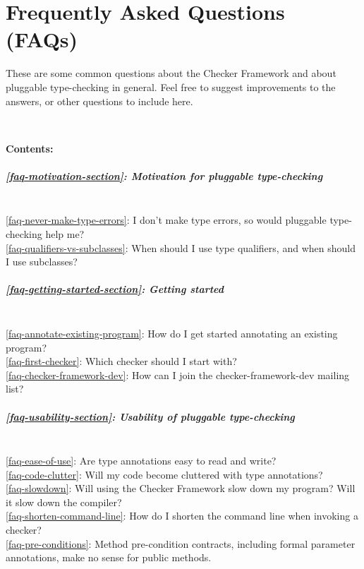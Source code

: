 \htmlhr
\chapter{Frequently Asked Questions (FAQs)\label{faq}}

These are some common questions about the Checker Framework and about
pluggable type-checking in general.  Feel free to suggest improvements to
the answers, or other questions to include here.


~

\newcommand{\faqtocpara}[1]{\paragraph{#1} ~}


\noindent
\textbf{Contents:}

\faqtocpara{\ref{faq-motivation-section}: Motivation for pluggable type-checking}
\\ \ref{faq-never-make-type-errors}: I don't make type errors, so would pluggable type-checking help me?
\\ \ref{faq-qualifiers-vs-subclasses}: When should I use type qualifiers, and when should I use subclasses?

\faqtocpara{\ref{faq-getting-started-section}: Getting started}
\\ \ref{faq-annotate-existing-program}: How do I get started annotating an existing program?
\\ \ref{faq-first-checker}: Which checker should I start with?
\\ \ref{faq-checker-framework-dev}: How can I join the checker-framework-dev mailing list?

\faqtocpara{\ref{faq-usability-section}: Usability of pluggable type-checking}
\\ \ref{faq-ease-of-use}: Are type annotations easy to read and write?
\\ \ref{faq-code-clutter}: Will my code become cluttered with type annotations?
\\ \ref{faq-slowdown}: Will using the Checker Framework slow down my program?  Will it slow down the compiler?
\\ \ref{faq-shorten-command-line}: How do I shorten the command line when invoking a checker?
\\ \ref{faq-pre-conditions}: Method pre-condition contracts, including formal parameter annotations, make no sense for public methods.

